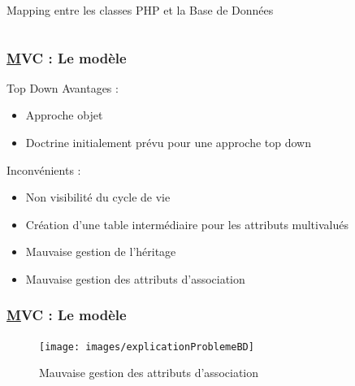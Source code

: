 \begin{frame}
\begin{block}{Mapping entre les classes PHP et la Base de Données}
\begin{columns}
	\end{columns}
	\end{block} 
\end{frame}




\speaker{\Julie}
\begin{frame}
	\frametitle{\underline{M}VC : Le modèle}
	\begin{block}{Top Down}
		Avantages :
		\begin{itemize}
			\item Approche objet
			\item Doctrine initialement prévu pour une approche top down
		\end{itemize}
 
		Inconvénients :
		\begin{itemize}
			\item Non visibilité du cycle de vie
			\item Création d'une table intermédiaire pour les attributs multivalués
			\item Mauvaise gestion de l'héritage
			\item Mauvaise gestion des attributs d'association
			
		\end{itemize}
	\end{block}
\end{frame}



\begin{frame}
	\frametitle{\underline{M}VC : Le modèle}
		\begin{figure}[!h]
			\begin{center}
				\texttt{[image: images/explicationProblemeBD]}
				\caption{Mauvaise gestion des attributs d'association}
			\end{center}
		\end{figure}
\end{frame}




